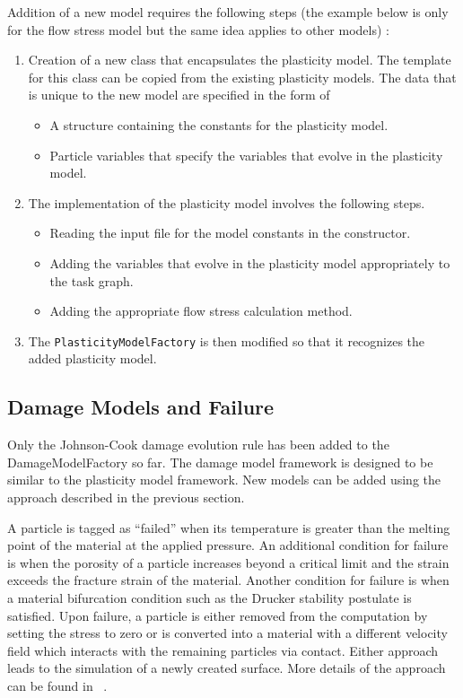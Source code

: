 Addition of a new model requires the following steps (the example below is only
for the flow stress model but the same idea applies to other models) :
\begin{enumerate}
    \item Creation of a new class that encapsulates the plasticity 
    model.  The template for this class can be copied from the
    existing plasticity models.  The data that is unique to 
    the new model are specified in the form of 
    \begin{itemize}
      \item A structure containing the constants for the plasticity
            model.
      \item Particle variables that specify the variables that 
            evolve in the plasticity model.
    \end{itemize}
    \item The implementation of the plasticity model involves the
    following steps.
    \begin{itemize}
      \item Reading the input file for the model constants in the
            constructor.
      \item Adding the variables that evolve in the plasticity model
            appropriately to the task graph.
      \item Adding the appropriate flow stress calculation method.
    \end{itemize}
    \item The \verb+PlasticityModelFactory+ is then modified so that
          it recognizes the added plasticity model.
\end{enumerate}

\subsection{Damage Models and Failure}
Only the Johnson-Cook damage evolution rule has been added to the 
DamageModelFactory so far.  The damage model framework is designed 
to be similar to the plasticity model framework.  New models can
be added using the approach described in the previous section.

  A particle is tagged as ``failed'' when its temperature is greater than the
  melting point of the material at the applied pressure.  An additional
  condition for failure is when the porosity of a particle increases beyond a
  critical limit and the strain exceeds the fracture strain of the material.  
  Another condition for failure is when a material bifurcation 
  condition such as the Drucker stability postulate is satisfied.  Upon failure,
  a particle is either removed from the computation by setting the stress to
  zero or is converted into a material with a different velocity field 
  which interacts with the remaining particles via contact.  Either approach
  leads to the simulation of a newly created surface.  More details of the
  approach can be found in ~\cite{Banerjee04a,Banerjee04c,Banerjee05}.

